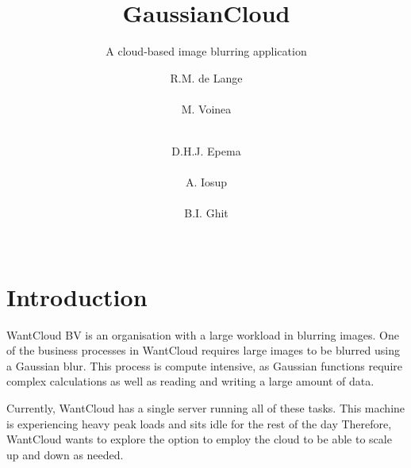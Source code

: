 \documentclass{acm_proc_article-sp}
\begin{document}
\title{GaussianCloud}
\subtitle{A cloud-based image blurring application}

\author{
\alignauthor
R.M. de Lange\\
		\\
\alignauthor
M. Voinea\\
		\\
\and
\alignauthor
D.H.J. Epema\\
		\\
\alignauthor
A. Iosup\\
		\\
\alignauthor
B.I. Ghit\\
		\\
}

\maketitle

\begin{abstract}
\end{abstract}

\section{Introduction}
WantCloud BV is an organisation with a large workload in blurring images.
One of the business processes in WantCloud requires large images to be blurred using a Gaussian blur.
This process is compute intensive, as Gaussian functions require complex calculations as well as reading and writing a large amount of data.

Currently, WantCloud has a single server running all of these tasks.
This machine is experiencing heavy peak loads and sits idle for the rest of the day
Therefore, WantCloud wants to explore the option to employ the cloud to be able to scale up and down as needed.
\end{document}
